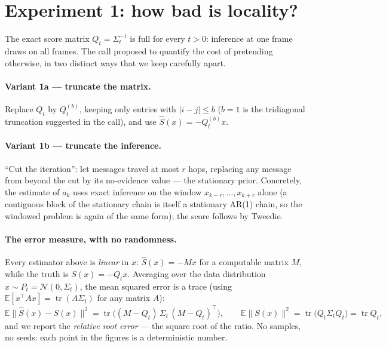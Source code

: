 \documentclass[11pt]{article}
\theoremstyle{definition}
\theoremstyle{remark}
\newcommand{\N}{\mathcal{N}}
\newcommand{\E}{\mathbb{E}}
\newcommand{\T}{^{\!\top}}
\DeclareMathOperator{\tr}{tr}
\begin{document}
\section{Experiment 1: how bad is locality?}\label{sec:exp1}

The exact score matrix $Q_t=\Sigma_t^{-1}$ is full for every $t>0$:
inference at one frame draws on all frames. The call proposed to quantify
the cost of pretending otherwise, in two distinct ways that we keep
carefully apart.

\paragraph{Variant 1a --- truncate the matrix.} Replace $Q_t$ by
$Q_t^{(b)}$, keeping only entries with $|i-j|\le b$ ($b=1$ is the
tridiagonal truncation suggested in the call), and use
$\hat S(x)=-Q_t^{(b)}x$.

\paragraph{Variant 1b --- truncate the inference.} ``Cut the iteration'':
let messages travel at most $r$ hops, replacing any message from beyond the
cut by its no-evidence value --- the stationary prior. Concretely, the
estimate of $a_k$ uses exact inference on the window
$x_{k-r},\dots,x_{k+r}$ alone (a contiguous block of the stationary chain
is itself a stationary AR(1) chain, so the windowed problem is again of the
same form); the score follows by Tweedie.

\paragraph{The error measure, with no randomness.} Every estimator above is
\emph{linear} in $x$: $\hat S(x)=-Mx$ for a computable matrix $M$, while
the truth is $S(x)=-Q_tx$. Averaging over the data distribution
$x\sim P_t=\N(0,\Sigma_t)$, the mean squared error is a trace
(using $\E[x\T Ax]=\tr(A\Sigma_t)$ for any matrix $A$):
\[
  \E\big\|\hat S(x)-S(x)\big\|^2
  =\tr\!\big((M-Q_t)\,\Sigma_t\,(M-Q_t)\T\big),
  \qquad
  \E\|S(x)\|^2=\tr\!\big(Q_t\Sigma_tQ_t\big)=\tr Q_t ,
\]
and we report the \emph{relative root error} --- the square root of the
ratio. No samples, no seeds: each point in the figures is a deterministic
number.
\end{document}
